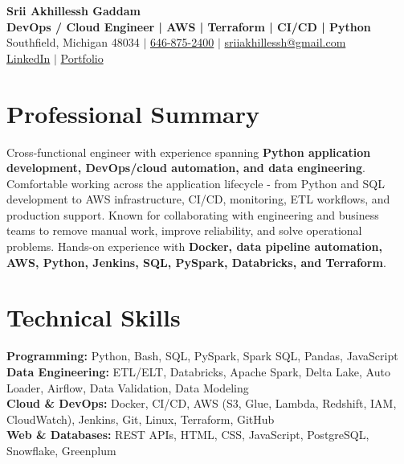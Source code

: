 \documentclass[letterpaper,10pt]{article}
\begin{document}
\fontsize{9.35pt}{10.45pt}\selectfont

\begin{center}
    {\LARGE \textbf{Srii Akhillessh Gaddam}} \\[-1pt]
    \textbf{DevOps / Cloud Engineer | AWS | Terraform | CI/CD | Python} \\[2pt]
    Southfield, Michigan 48034 $|$
    \href{tel:6468752400}{646-875-2400} $|$
    \href{mailto:sriiakhillessh@gmail.com}{sriiakhillessh@gmail.com} \\[1pt]
    \href{https://www.linkedin.com/in/srii-akhiilessh-gaddam-b48668191/}{LinkedIn} $|$
    \href{https://sriiakhillesshg.github.io/portfolio/}{Portfolio}
\end{center}
\vspace{-8pt}

\section{Professional Summary}
\small{Cross-functional engineer with experience spanning \textbf{Python application development, DevOps/cloud automation, and data engineering}. Comfortable working across the application lifecycle - from Python and SQL development to AWS infrastructure, CI/CD, monitoring, ETL workflows, and production support. Known for collaborating with engineering and business teams to remove manual work, improve reliability, and solve operational problems. Hands-on experience with \textbf{Docker, data pipeline automation, AWS, Python, Jenkins, SQL, PySpark, Databricks, and Terraform}.}

\section{Technical Skills}
\small{
\textbf{Programming:} Python, Bash, SQL, PySpark, Spark SQL, Pandas, JavaScript \\
\textbf{Data Engineering:} ETL/ELT, Databricks, Apache Spark, Delta Lake, Auto Loader, Airflow, Data Validation, Data Modeling \\
\textbf{Cloud \& DevOps:} Docker, CI/CD, AWS (S3, Glue, Lambda, Redshift, IAM, CloudWatch), Jenkins, Git, Linux, Terraform, GitHub \\
\textbf{Web \& Databases:} REST APIs, HTML, CSS, JavaScript, PostgreSQL, Snowflake, Greenplum
}
\end{document}
